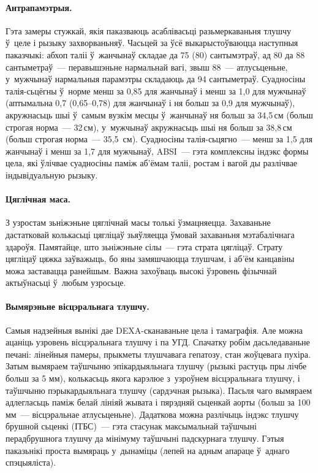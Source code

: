 \paragraph{Антрапамэтрыя.}
Гэта замеры стужкай, якія паказваюць асаблівасьці разьмеркаваньня тлушчу ў~целе і рызыку захворваньняў. Часьцей за ўсё выкарыстоўваюцца наступныя паказчыкі: абхоп таліі ў~жанчынаў складае да 75 (80) сантымэтраў, ад 80 да 88 сантыметраў~--- перавышэньне нармальнай вагі, звыш 88~--- атлусьценьне, у~мужчынаў нармальныя парамэтры складаюць да 94 сантыметраў. Суадносіны талія-сьцёгны ў~норме менш за 0,85 для жанчынаў і менш за 1,0 для мужчынаў (аптымальна 0,7 (0,65--0,78) для жанчынаў і ня больш за 0,9 для мужчынаў), акружнасьць шыі ў~самым вузкім месцы ў~жанчынаў ня больш за 34,5\,см (больш строгая норма~--- 32\,см), у~мужчынаў акружнасьць шыі ня больш за 38,8\,см (больш строгая норма~--- 35,5~см). Суадносіны талія-сьцягно~--- менш за 1,5 для жанчынаў і менш за 1,7 для мужчынаў, ABSI~--- гэта комплексны індэкс формы цела, які ўлічвае суадносіны паміж аб'ёмам таліі, ростам і вагой ды разлічвае індывідуальную рызыку.

\paragraph{Цяглічная маса.}
З узростам зьніжэньне цяглічнай масы толькі ўзмацняецца. Захаваньне дастатковай колькасьці цягліцаў зьяўляецца ўмовай захаваньня мэтабалічнага здароўя. Памятайце, што зьніжэньне сілы~--- гэта страта цягліцаў. Страту цягліцаў цяжка заўважыць, бо яны замяшчаюцца тлушчам, і аб'ём канцавіны можа заставацца ранейшым. Важна захоўваць высокі ўзровень фізычнай актыўнасьці ў~любым узросьце.

\paragraph{Вымярэньне вісцэральнага тлушчу.}
Самыя надзейныя вынікі дае DEXA-сканаваньне цела і тамаграфія. Але можна ацаніць узровень вісцэральнага тлушчу і па УГД. Спачатку робім дасьледаваньне печані: лінейныя памеры, прыкметы тлушчавага гепатозу, стан жоўцевага пухіра. Затым вымяраем таўшчыню эпікардыяльнага тлушчу (рызыкі растуць пры лічбе больш за 5 мм), колькасьць якога карэлюе з~узроўнем вісцэральнага тлушчу, і таўшчыню пэрыкардыяльнага тлушчу (сардэчная рызыка). Пасьля чаго вымяраем адлегласьць паміж белай лініяй жывата і пярэдняй сьценкай аорты (больш за 100 мм~--- вісцэральнае атлусьценьне). Дадаткова можна разлічыць індэкс тлушчу брушной сьценкі (ІТБС)~--- гэта стасунак максымальнай таўшчыні перадбрушнога тлушчу да мінімуму таўшчыні падскурнага тлушчу. Гэтыя паказьнікі проста вымяраць у~дынаміцы (лепей на адным апараце ў~аднаго спэцыяліста).

